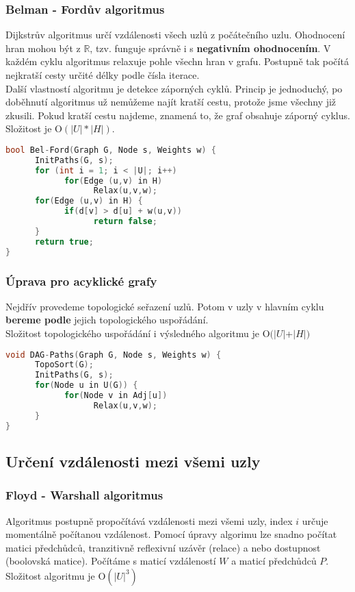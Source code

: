 \documentclass[12pt]{article}
\begin{document}
\subsubsection{Belman - Fordův algoritmus}
Dijkstrův algoritmus určí vzdálenosti všech uzlů z počátečního uzlu. Ohodnocení hran mohou být z $\mathbb{R}$, tzv. funguje správně i s \textbf{negativním ohodnocením}.
V každém cyklu algoritmus relaxuje pohle všechn hran v grafu. Postupně tak počítá nejkratší cesty určité délky podle čísla iterace.\\
Další vlastností algoritmu je detekce záporných cyklů. Princip je jednoduchý, po doběhnutí algoritmus už nemůžeme najít kratší cestu, protože jsme všechny již zkusili. Pokud kratší cestu najdeme, znamená to, že graf obsahuje záporný cyklus.
Složitost je $\textrm{O}(\left|U\right|*\left|H\right|)$.

\begin{lstlisting}[language=c++]
bool Bel-Ford(Graph G, Node s, Weights w) {
      InitPaths(G, s);
      for (int i = 1; i < |U|; i++)
            for(Edge (u,v) in H)
                  Relax(u,v,w);
      for(Edge (u,v) in H) {
            if(d[v] > d[u] + w(u,v))
                  return false; 
      }
      return true;
}
\end{lstlisting}

\subsubsection{Úprava pro acyklické grafy}
Nejdřív provedeme topologické seřazení uzlů. Potom v uzly v hlavním cyklu \textbf{bereme podle} jejich topologického uspořádání.\\
Složitost topologického uspořádání i výsledného algoritmu je $\textrm{O}(\left|U\right|$+$\left|H\right|)$

\begin{lstlisting}[language=c]
void DAG-Paths(Graph G, Node s, Weights w) {
      TopoSort(G);
      InitPaths(G, s);
      for(Node u in U(G)) {
            for(Node v in Adj[u])
                  Relax(u,v,w);
      }
}
\end{lstlisting}


\subsection{Určení vzdálenosti mezi všemi uzly}
\subsubsection{Floyd - Warshall algoritmus}
Algoritmus postupně propočítává vzdálenosti mezi všemi uzly, index $i$ určuje momentálně počítanou vzdálenost. Pomocí úpravy algorimu lze snadno počítat matici předchůdců, tranzitivně reflexivní uzávěr (relace) a nebo dostupnost (boolovská matice). Počítáme s maticí vzdáleností $W$ a maticí předchůdců $P$.\\
Složitost algoritmu je $\textrm{O}(\left|U\right|^3)$
\end{document}
